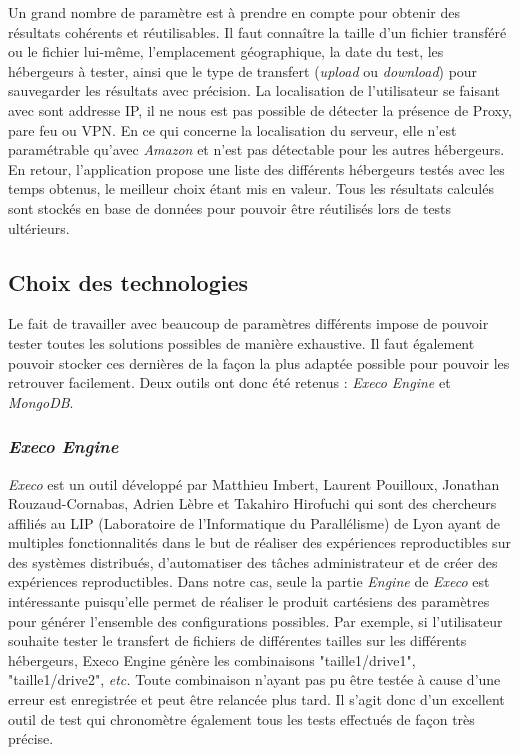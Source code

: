 \documentclass[10pt]{article}
\begin{document}
Un grand nombre de paramètre est à prendre en compte pour obtenir des résultats
cohérents et réutilisables. Il faut connaître la taille d'un fichier transféré
ou le fichier lui-même, l'emplacement géographique, la date du test, les hébergeurs à tester, ainsi que le type de transfert
(\textit{upload} ou \textit{download}) pour sauvegarder les résultats avec
précision. La localisation de l'utilisateur se faisant avec sont addresse IP, il ne nous est pas possible de détecter la présence de Proxy, pare feu ou VPN. En ce qui concerne la localisation du serveur, elle n'est paramétrable qu'avec \textit{Amazon} et n'est pas détectable pour les autres hébergeurs. En retour, l'application propose une liste des différents hébergeurs
testés avec les temps obtenus, le meilleur choix étant mis en valeur. Tous les
résultats calculés sont stockés en base de données pour pouvoir être réutilisés
lors de tests ultérieurs.

  
\subsection{Choix des technologies}

Le fait de travailler avec beaucoup de paramètres différents impose de pouvoir
tester toutes les solutions possibles de manière exhaustive. Il faut également
pouvoir stocker ces dernières de la façon la plus adaptée possible pour pouvoir
les retrouver facilement. Deux outils ont donc été retenus : \textit{Execo
Engine} et \textit{MongoDB}.

\subsubsection{\textit{Execo Engine}}

\textit{Execo} est un outil développé par Matthieu Imbert, Laurent Pouilloux,
Jonathan Rouzaud-Cornabas, Adrien Lèbre et Takahiro Hirofuchi qui sont des
chercheurs affiliés au LIP (Laboratoire de l'Informatique du Parallélisme)  de
Lyon ayant de multiples fonctionnalités dans le but de réaliser des expériences
reproductibles sur des systèmes distribués, d'automatiser des tâches
administrateur et de créer des expériences reproductibles. Dans notre cas,
seule la partie \textit{Engine} de \textit{Execo} est intéressante puisqu'elle
permet de réaliser le produit cartésiens des paramètres pour générer l'ensemble
des configurations possibles. Par exemple, si l'utilisateur souhaite tester le
transfert de fichiers de différentes tailles sur les différents hébergeurs,
Execo Engine génère les combinaisons "taille1/drive1", "taille1/drive2",
\textit{etc.} Toute combinaison n'ayant pas pu être testée à cause d'une erreur
est enregistrée et peut être relancée plus tard. Il s'agit donc d'un excellent
outil de test qui chronomètre également tous les tests effectués de façon très
précise.
\end{document}
